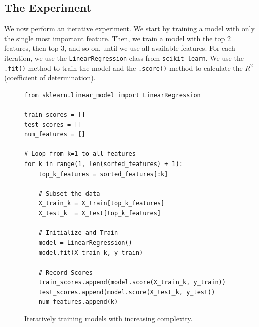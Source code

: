 \subsection{The Experiment}
We now perform an iterative experiment. We start by training a model with only the single most important
feature. Then, we train a model with the top 2 features, then top 3, and so on, until we use all available
features.  For each iteration, we use the \texttt{LinearRegression} class from \texttt{scikit-learn}. We use
the \texttt{.fit()} method to train the model and the \texttt{.score()} method to calculate the $R^2$
(coefficient of determination). 

\begin{figure}[!ht]
\centering
\begin{verbatim}
from sklearn.linear_model import LinearRegression

train_scores = []
test_scores = []
num_features = []

# Loop from k=1 to all features
for k in range(1, len(sorted_features) + 1):
    top_k_features = sorted_features[:k]
    
    # Subset the data
    X_train_k = X_train[top_k_features]
    X_test_k  = X_test[top_k_features]
    
    # Initialize and Train
    model = LinearRegression()
    model.fit(X_train_k, y_train)
    
    # Record Scores
    train_scores.append(model.score(X_train_k, y_train))
    test_scores.append(model.score(X_test_k, y_test))
    num_features.append(k)
\end{verbatim}
\caption{Iteratively training models with increasing complexity.}
\label{fig:experiment_loop}
\end{figure}

